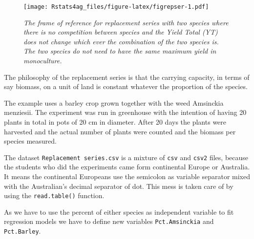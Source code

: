 \documentclass[letterpaper,]{book}
\newenvironment{Shaded}{\begin{snugshade}}{\end{snugshade}}
\newcommand{\DataTypeTok}[1]{\textcolor[rgb]{0.13,0.29,0.53}{#1}}
\newcommand{\DecValTok}[1]{\textcolor[rgb]{0.00,0.00,0.81}{#1}}
\newcommand{\FloatTok}[1]{\textcolor[rgb]{0.00,0.00,0.81}{#1}}
\newcommand{\KeywordTok}[1]{\textcolor[rgb]{0.13,0.29,0.53}{\textbf{#1}}}
\newcommand{\NormalTok}[1]{#1}
\newcommand{\OperatorTok}[1]{\textcolor[rgb]{0.81,0.36,0.00}{\textbf{#1}}}
\newcommand{\OtherTok}[1]{\textcolor[rgb]{0.56,0.35,0.01}{#1}}
\newcommand{\StringTok}[1]{\textcolor[rgb]{0.31,0.60,0.02}{#1}}
\begin{document}
\begin{figure}
\centering
\texttt{[image: Rstats4ag\_files/figure-latex/figrepser-1.pdf]}
\caption{\label{fig:figrepser}\emph{The frame of reference for replacement series with two species where there is no competition between species and the Yield Total (YT) does not change which ever the combination of the two species is. The two species do not need to have the same maximum yield in monoculture.}}
\end{figure}

The philosophy of the replacement series is that the carrying capacity, in terms of say biomass, on a unit of land is constant whatever the proportion of the species.

The example uses a barley crop grown together with the weed Amsinckia menziesii. The experiment was run in greenhouse with the intention of having 20 plants in total in pots of 20 cm in diameter. After 20 days the plants were harvested and the actual number of plants were counted and the biomass per species measured.

The dataset \texttt{Replacement\ series.csv} is a mixture of \texttt{csv} and \texttt{csv2} files, because the students who did the experiments came form continental Europe or Australia. It means the continental Europeans use the semicolon as variable separator mixed with the Australian's decimal separator of dot. This mess is taken care of by using the \texttt{read.table()} function.

As we have to use the percent of either species as independent variable to fit regression models we have to define new variables \texttt{Pct.Amsinckia} and \texttt{Pct.Barley}.

\begin{Shaded}
\end{Shaded}
\end{document}
